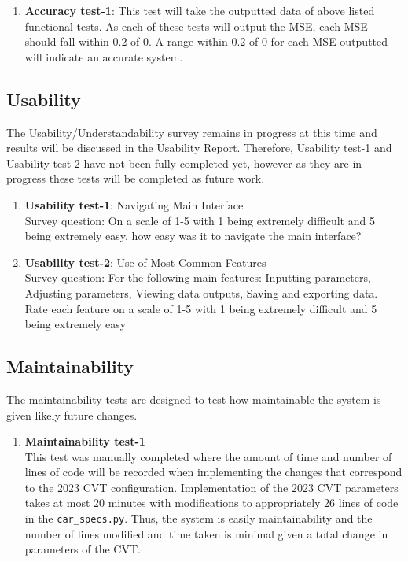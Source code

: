 \documentclass[12pt, titlepage]{article}
\begin{document}
\begin{enumerate}
  \item{\textbf{Accuracy test-1}:}
  This test will take the outputted data of above listed functional tests. 
  As each of these tests will output the MSE, each MSE should fall within 0.2 of 0.
  A range within 0.2 of 0 for each MSE outputted will indicate an accurate system. 
  
\end{enumerate}

		
\subsection{Usability}
The Usability/Understandability survey remains in progress at this time and results will be discussed in the \href{file:../UsabilityReport/UsabilityReport.pdf}{Usability Report}. 
Therefore, Usability test-1 and Usability test-2 have not been fully completed yet, however as they are in progress these tests will be completed as future work. 

\begin{enumerate}
\item{\textbf{Usability test-1}: Navigating Main Interface}\\
Survey question: On a scale of 1-5 with 1 being extremely difficult and 5 being extremely easy, how easy was it to navigate the main interface? 
\item{\textbf{Usability test-2}: Use of Most Common Features}\\
Survey question: For the following main features: Inputting parameters, Adjusting parameters, Viewing data outputs, Saving and exporting data. 
Rate each feature on a scale of 1-5 with 1 being extremely difficult and 5 being extremely easy
\end{enumerate}

\subsection{Maintainability}
The maintainability tests are designed to test how maintainable the system is given likely future changes.
\begin{enumerate}
\item{\textbf{Maintainability test-1}}\\
This test was manually completed where the amount of time and number of lines of code
will be recorded when implementing the changes that correspond to the 2023 CVT configuration. 
Implementation of the 2023 CVT parameters takes at most 20 minutes with modifications to appropriately 26 lines of code in the \texttt{car\_specs.py}.
Thus, the system is easily maintainability and the number of lines modified and time taken is minimal given a total change in parameters of the CVT. 
\end{enumerate}
\end{document}
